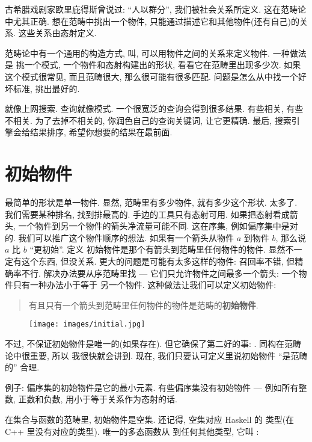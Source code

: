 
\lettrine[lhang=0.17]{古} 希腊戏剧家欧里庇得斯曾说过: ``人以群分'', 我们被社会关系所定义.
这在范畴论中尤其正确. 想在范畴中挑出一个物件, 只能通过描述它和其他物件(还有自己)的关系.
这些关系由态射定义.

范畴论中有一个通用的构造方式, 叫, 可以用物件之间的关系来定义物件. 一种做法是
挑一个模式, 一个物件和态射构建出的形状, 看看它在范畴里出现多少次. 如果这个模式很常见, 而且范畴很大,
那么很可能有很多匹配. 问题是怎么从中找一个好坏标准, 挑出最好的.

就像上网搜索. 查询就像模式. 一个很宽泛的查询会得到很多结果. 有些相关, 有些不相关. 为了去掉不相关的,
你润色自己的查询关键词, 让它更精确. 最后, 搜索引擎会给结果排序, 希望你想要的结果在最前面.

\section{初始物件}

最简单的形状是单一物件. 显然, 范畴里有多少物件, 就有多少这个形状. 太多了. 我们需要某种排名, 找到排最高的.
手边的工具只有态射可用. 如果把态射看成箭头, 一个物件到另一个物件的箭头净流量可能不同. 这在序集, 例如偏序集中是对的.
我们可以推广这个物件顺序的想法. 如果有一个箭头从物件 $a$ 到物件 $b$, 那么说 $a$ 比 $b$ ``更初始''. 定义
初始物件是那个有箭头到范畴里任何物件的物件. 显然不一定有这个东西, 但没关系. 更大的问题是可能有太多这样的物件:
召回率不错, 但精确率不行. 解决办法要从序范畴里找 --- 它们只允许物件之间最多一个箭头: 一个物件只有一种办法小于等于
另一个物件. 这种做法让我们可以定义初始物件:

\begin{quote}
  有且只有一个箭头到范畴里任何物件的物件是范畴的\textbf{初始物件}.
\end{quote}

\begin{figure}[H]
  \centering
  \texttt{[image: images/initial.jpg]}
\end{figure}

\noindent
不过, 不保证初始物件是唯一的(如果存在). 但它确保了第二好的事: . 同构在范畴论中很重要, 所以
我很快就会讲到. 现在, 我们只要认可定义里说初始物件 ``是范畴的'' 合理.

例子: 偏序集的初始物件是它的最小元素. 有些偏序集没有初始物件 --- 例如所有整数, 正数和负数, 用小于等于关系作为态射的话.

在集合与函数的范畴里, 初始物件是空集. 还记得, 空集对应 Haskell 的  类型(在 C++ 里没有对应的类型).
唯一的多态函数从  到任何其他类型, 它叫 :

